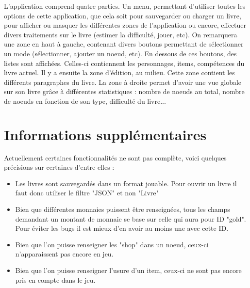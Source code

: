 		L'application comprend quatre parties. Un menu, permettant d'utiliser toutes les options de cette application, que cela soit pour sauvegarder ou charger un livre, pour afficher ou masquer les différentes zones de l'application ou encore, effectuer divers traitements sur le livre (estimer la difficulté, jouer, etc). On remarquera une zone en haut à gauche, contenant divers boutons permettant de sélectionner un mode (sélectionner, ajouter un noeud, etc). En dessous de ces boutons, des listes sont affichées. Celles-ci contiennent les personnages, items, compétences du livre actuel. Il y a ensuite la zone d'édition, au milieu. Cette zone contient les différents paragraphes du livre. La zone à droite permet d'avoir une vue globale sur son livre grâce à différentes statistiques : nombre de noeuds au total, nombre de noeuds en fonction de son type, difficulté du livre...

	\section{Informations supplémentaires}

		Actuellement certaines fonctionnalités ne sont pas complète, voici quelques précisions sur certaines d'entre elles :

		\begin{itemize}
			\item{Les livres sont sauvegardés dans un format jouable. Pour ouvrir un livre il faut donc utiliser le filtre "JSON" et non "Livre"}
			\item{Bien que différentes monnaies puissent être renseignées, tous les champs demandant un montant de monnaie se base sur celle qui aura pour ID "gold". Pour éviter les bugs il est mieux d'en avoir au moins une avec cette ID.}
			\item{Bien que l'on puisse renseigner les "shop" dans un noeud, ceux-ci n'apparaissent pas encore en jeu.}
			\item{Bien que l'on puisse renseigner l'usure d'un item, ceux-ci ne sont pas encore pris en compte dans le jeu.}
		\end{itemize}
